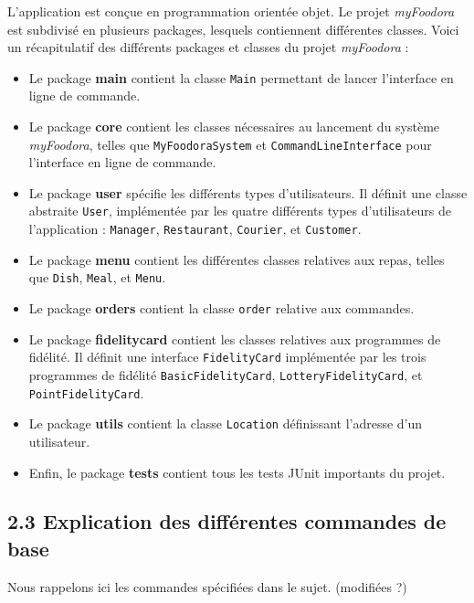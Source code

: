 L'application est conçue en programmation orientée objet. Le projet \textit{myFoodora} est subdivisé en plusieurs packages, lesquels contiennent différentes classes. Voici un récapitulatif des différents packages et classes du projet \textit{myFoodora} :
\begin{itemize}
    \item Le package \textbf{main} contient la classe \texttt{Main} permettant de lancer l'interface en ligne de commande.
    \item Le package \textbf{core} contient les classes nécessaires au lancement du système \textit{myFoodora}, telles que \texttt{MyFoodoraSystem} et \texttt{CommandLineInterface} pour l'interface en ligne de commande.
    \item Le package \textbf{user} spécifie les différents types d'utilisateurs. Il définit une classe abstraite \texttt{User}, implémentée par les quatre différents types d'utilisateurs de l'application : \texttt{Manager}, \texttt{Restaurant}, \texttt{Courier}, et \texttt{Customer}.
    \item Le package \textbf{menu} contient les différentes classes relatives aux repas, telles que \texttt{Dish}, \texttt{Meal}, et \texttt{Menu}.
    \item Le package \textbf{orders} contient la classe \texttt{order} relative aux commandes.
    \item Le package \textbf{fidelitycard} contient les classes relatives aux programmes de fidélité. Il définit une interface \texttt{FidelityCard} implémentée par les trois programmes de fidélité \texttt{BasicFidelityCard}, \texttt{LotteryFidelityCard}, et \texttt{PointFidelityCard}.
    \item Le package \textbf{utils} contient la classe \texttt{Location} définissant l'adresse d'un utilisateur.
    \item Enfin, le package \textbf{tests} contient tous les tests JUnit importants du projet.
\end{itemize}

\subsection*{2.3 Explication des différentes commandes de base}

Nous rappelons ici les commandes spécifiées dans le sujet. (modifiées ?)\\

